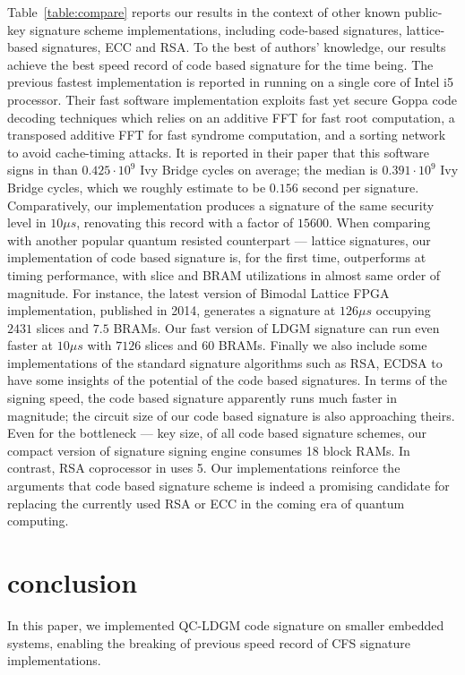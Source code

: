 \documentclass[10pt,journal,compsoc]{IEEEtran}
\begin{document}
Table~\ref{table:compare} reports our  results in the context of other known public-key signature scheme implementations, including code-based signatures\cite{bernstein2013mcbits,landais2012cfs,landais2012implementing,beuchat2004fpga}, lattice-based signatures\cite{poppelmann2014enhanced,guneysu2013software,guneysu2012practical}, ECC\cite{glas2011prime} and RSA\cite{suzuki2011maximize}. To the best of authors' knowledge, our results achieve the best speed record of code based signature for the time being. The previous fastest implementation is reported in \cite{bernstein2013mcbits} running on a single core of Intel i5 processor. Their fast software implementation exploits fast yet secure Goppa code decoding techniques which relies on an additive FFT for fast root computation, a transposed additive FFT for fast syndrome computation, and a sorting network to avoid cache-timing attacks. It is reported in their paper that this software signs in than $0.425 \cdot 10^9$ Ivy Bridge cycles on average; the median is $0.391\cdot 10^9$ Ivy Bridge cycles, which we roughly estimate to be $0.156$ second per signature. Comparatively, our implementation produces a signature of the same security level in
$10 \mu s$, renovating this record with a factor of $15600$. When comparing with another popular quantum resisted counterpart --- lattice signatures, our implementation of code based signature is, for the first time, outperforms at timing performance, with slice and BRAM utilizations in almost same order of magnitude. For instance, the latest version of Bimodal Lattice FPGA implementation, published in 2014, generates a signature at $126 \mu s$ occupying $2431$ slices and $7.5$ BRAMs.  Our fast version of LDGM signature can run even faster at $10 \mu s$ with $7126$ slices and $60$ BRAMs. Finally we also include some implementations of the standard signature algorithms such as RSA, ECDSA to have some insights of the potential of the code based signatures. In terms of the signing speed, the code based signature apparently runs much faster in magnitude; the circuit size of our code based signature is also approaching theirs. Even for the bottleneck --- key size, of all code based signature schemes,  our compact version of signature signing engine consumes 18 block RAMs. In contrast, RSA coprocessor in \cite{suzuki2011maximize} uses 5.  Our implementations reinforce the arguments that code based signature scheme is indeed a promising candidate for replacing the currently used RSA or ECC in the coming era of quantum computing.


\section{conclusion}
In this paper, we implemented  QC-LDGM code signature on smaller embedded systems,  enabling the breaking of previous speed record of CFS signature implementations.
\end{document}
